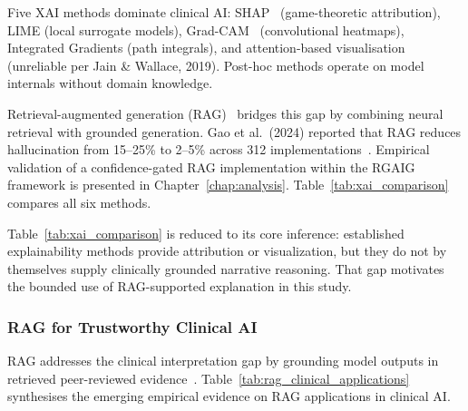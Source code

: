 Five XAI methods dominate clinical AI: SHAP~\cite{lundberg2017shap} (game-theoretic attribution), LIME (local surrogate models), Grad-CAM~\cite{selvaraju2017gradcam} (convolutional heatmaps), Integrated Gradients (path integrals), and attention-based visualisation (unreliable per Jain \& Wallace, 2019). Post-hoc methods operate on model internals without domain knowledge.

Retrieval-augmented generation (RAG)~\cite{lewis2020rag} bridges this gap by combining neural retrieval with grounded generation. Gao et al.\ (2024) reported that RAG reduces hallucination from 15--25\% to 2--5\% across 312 implementations~\cite{gao2024rag}. Empirical validation of a confidence-gated RAG implementation within the RGAIG framework is presented in Chapter~\ref{chap:analysis}. Table~\ref{tab:xai_comparison} compares all six methods.

Table~\ref{tab:xai_comparison} is reduced to its core inference: established explainability methods provide attribution or visualization, but they do not by themselves supply clinically grounded narrative reasoning. That gap motivates the bounded use of RAG-supported explanation in this study.

\subsubsection{RAG for Trustworthy Clinical AI}

RAG addresses the clinical interpretation gap by grounding model outputs in retrieved peer-reviewed evidence~\cite{lewis2020rag, gao2024rag}. Table~\ref{tab:rag_clinical_applications} synthesises the emerging empirical evidence on RAG applications in clinical AI.

